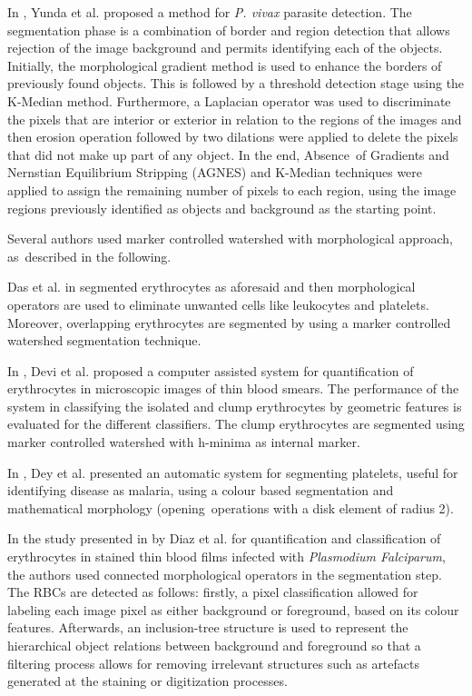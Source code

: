 \documentclass[final,a4paper,12pt,english]{UnicaPhdThesis3}
\begin{document}
	In \cite{Yunda2012}, Yunda et al. proposed a method for \textit{P. vivax} parasite detection. The segmentation phase is a combination of border and region detection that allows rejection of the image background and permits identifying each of the objects. Initially, the morphological gradient method is used to enhance the borders of previously found objects. This is followed by a threshold detection stage using the K-Median method.
	Furthermore, a Laplacian operator was used to discriminate the pixels that are interior or exterior in relation to the regions of the images and then erosion operation followed by two dilations were applied to delete the pixels that did not make up part of any object. In the end, Absence~of Gradients and Nernstian Equilibrium Stripping (AGNES) and K-Median techniques were applied to assign the remaining number of pixels to each region, using the image regions previously identified as objects and background as the starting point.
	
	Several authors used marker controlled watershed \cite{Soille2004} with morphological approach, as~described in the following.
	
	Das et al. in \cite{Das2011,Das2013,Das2014,Das2015} segmented erythrocytes as aforesaid and then morphological operators are used to eliminate unwanted cells like leukocytes and platelets. Moreover, overlapping erythrocytes are segmented by using a marker controlled watershed segmentation technique.
	
	In \cite{Devi2017}, Devi et al. proposed a computer assisted system for quantification of erythrocytes in microscopic images of thin blood smears. The performance of the system in classifying the isolated and clump erythrocytes by geometric features is evaluated for the different classifiers. The clump erythrocytes are segmented using marker controlled watershed with h-minima as internal marker.
	
	In \cite{Dey2015}, Dey et al. presented an automatic system for segmenting platelets, useful for identifying disease as malaria, using a colour based segmentation and mathematical morphology (opening~operations with a disk element of radius 2).
	
	In the study presented in \cite{Diaz2009} by Diaz et al. for quantification and classification of erythrocytes in stained thin blood films infected with \textit{Plasmodium Falciparum}, the authors used connected morphological operators in the segmentation step. The RBCs are detected as follows: firstly, a pixel classification allowed for labeling each image pixel as either background or foreground, based on its colour features. Afterwards, an inclusion-tree structure is used to represent the hierarchical object relations between background and foreground so that a filtering process allows for removing irrelevant structures such as artefacts generated at the staining or digitization processes.
	
\end{document}
